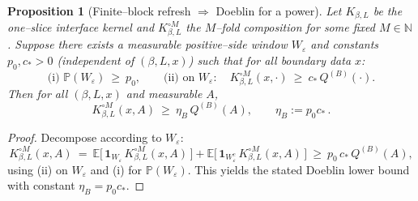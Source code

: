 \documentclass[11pt]{amsart}
\theoremstyle{plain}
\newtheorem{proposition}[theorem]{Proposition}
\theoremstyle{definition}
\theoremstyle{remark}
\begin{document}
\begin{proposition}[Finite--block refresh $\Rightarrow$ Doeblin for a power]\label{prop:block-refresh-doeblin}
Let $K_{\beta,L}$ be the one--slice interface kernel and $K_{\beta,L}^{\circ M}$ the $M$--fold composition for some fixed $M\in\mathbb N$. Suppose there exists a measurable positive--side window $W_\varepsilon$ and constants $p_0,c_*>0$ (independent of $(\beta,L,x)$) such that for all boundary data $x$:
\[
  \text{(i) }\mathbb P(W_\varepsilon)\ \ge\ p_0,\qquad
  \text{(ii) on }W_\varepsilon:\quad K_{\beta,L}^{\circ M}(x,\cdot)\ \ge\ c_*\, Q^{(B)}(\cdot).
\]
Then for all $(\beta,L,x)$ and measurable $A$,
\[
  K_{\beta,L}^{\circ M}(x,A)\ \ge\ \eta_B\, Q^{(B)}(A),\qquad \eta_B:=p_0 c_*\,.
\]
\end{proposition}
\begin{proof}
Decompose according to $W_\varepsilon$:
\[
  K_{\beta,L}^{\circ M}(x,A)
   \ =\ \mathbb E\big[\,\mathbf 1_{W_\varepsilon}\, K_{\beta,L}^{\circ M}(x,A)\,\big]
       + \mathbb E\big[\,\mathbf 1_{W_\varepsilon^c}\, K_{\beta,L}^{\circ M}(x,A)\,\big]
   \ \ge\ p_0\, c_*\, Q^{(B)}(A),
\]
using (ii) on $W_\varepsilon$ and (i) for $\mathbb P(W_\varepsilon)$. This yields the stated Doeblin lower bound with constant $\eta_B=p_0 c_*$. 
\end{proof}
\end{document}
